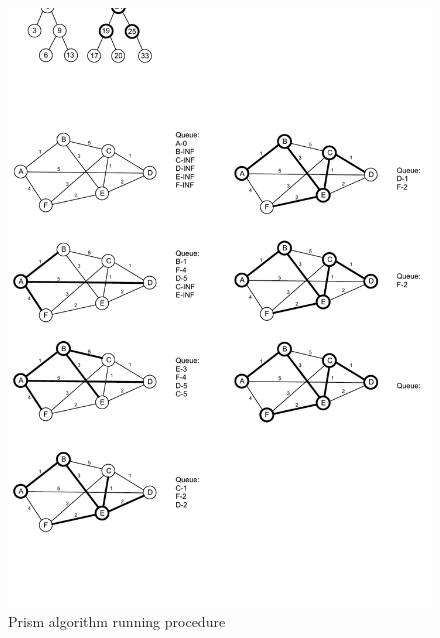 \documentclass[]{article}
\begin{document}
\begin{figure}
	\centering
	\includegraphics[width=\linewidth]{6_Prism}
	\caption{Prism algorithm running procedure}
	\label{fig:6_Prism}
\end{figure}
\end{document}
